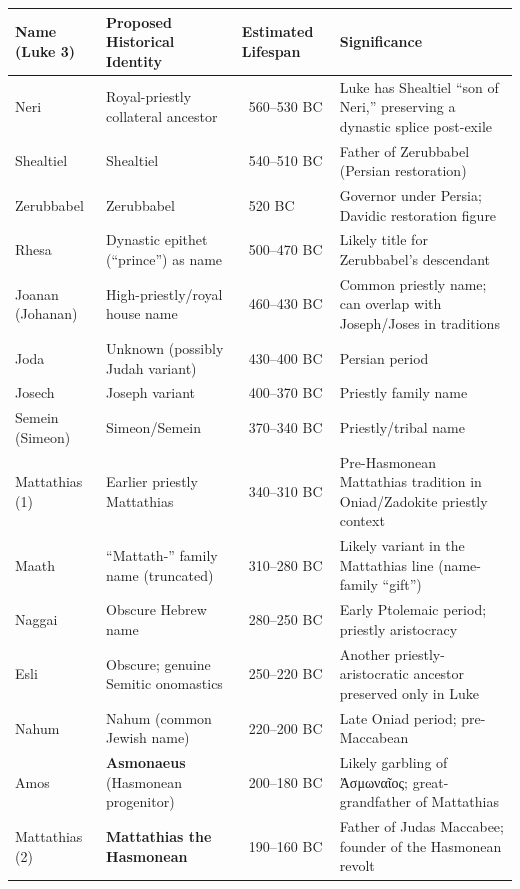 \begin{table}[h]
    \centering
    \begin{tabular}{|l|p{3.4cm}|p{2.8cm}|p{6.6cm}|}
        \hline
        \textbf{Name (Luke 3)} & \textbf{Proposed Historical Identity} & \textbf{Estimated Lifespan} & \textbf{Significance} \\ \hline
        Neri & Royal-priestly collateral ancestor & ~560--530 BC & Luke has Shealtiel “son of Neri,” preserving a dynastic splice post-exile \\ \hline
        Shealtiel & Shealtiel & ~540--510 BC & Father of Zerubbabel (Persian restoration) \\ \hline
        Zerubbabel & Zerubbabel & ~520 BC & Governor under Persia; Davidic restoration figure \\ \hline
        Rhesa & Dynastic epithet (“prince”) as name & ~500--470 BC & Likely title for Zerubbabel’s descendant \\ \hline
        Joanan (Johanan) & High-priestly/royal house name & ~460--430 BC & Common priestly name; can overlap with Joseph/Joses in traditions \\ \hline
        Joda & Unknown (possibly Judah variant) & ~430--400 BC & Persian period \\ \hline
        Josech & Joseph variant & ~400--370 BC & Priestly family name \\ \hline
        Semein (Simeon) & Simeon/Semein & ~370--340 BC & Priestly/tribal name \\ \hline
        Mattathias (1) & Earlier priestly Mattathias & ~340--310 BC & Pre-Hasmonean Mattathias tradition in Oniad/Zadokite priestly context \\ \hline
        Maath & “Mattath-” family name (truncated) & ~310--280 BC & Likely variant in the Mattathias line (name-family “gift”) \\ \hline
        Naggai & Obscure Hebrew name & ~280--250 BC & Early Ptolemaic period; priestly aristocracy \\ \hline
        Esli & Obscure; genuine Semitic onomastics & ~250--220 BC & Another priestly-aristocratic ancestor preserved only in Luke \\ \hline
        Nahum & Nahum (common Jewish name) & ~220--200 BC & Late Oniad period; pre-Maccabean \\ \hline
        Amos & \textbf{Asmonaeus} (Hasmonean progenitor) & ~200--180 BC & Likely garbling of Ἀσμωναῖος; great-grandfather of Mattathias \\ \hline
        Mattathias (2) & \textbf{Mattathias the Hasmonean} & ~190--160 BC & Father of Judas Maccabee; founder of the Hasmonean revolt \\ \hline

\end{tabular}
\end{table}
